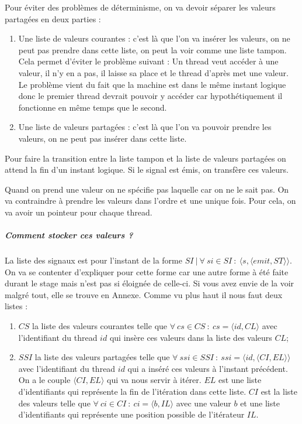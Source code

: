 \documentclass[10pt,a4paper]{report}
\begin{document}
	Pour éviter des problèmes de déterminisme, on va devoir séparer les valeurs partagées en deux parties :
	\begin{enumerate}
		\item Une liste de valeurs courantes : c'est là que l'on va insérer les valeurs, on ne peut pas prendre dans cette liste, on peut la voir comme une liste tampon. Cela permet d'éviter le problème suivant : 
		\smallbreak
		Un thread veut accéder à une valeur, il n'y en a pas, il laisse sa place et le thread d'après met une valeur. Le problème vient du fait que la machine est dans le même instant logique donc le premier thread devrait pouvoir y accéder car hypothétiquement il fonctionne en même temps que le second.
		
		\item Une liste de valeurs partagées : c'est là que l'on va pouvoir prendre les valeurs, on ne peut pas insérer dans cette liste.
	\end{enumerate}
	\smallbreak
	Pour faire la transition entre la liste tampon et la liste de valeurs partagées on attend la fin d'un instant logique. Si le signal est émis, on transfère ces valeurs.
	\medbreak
	
	Quand on prend une valeur on ne spécifie pas laquelle car on ne le sait pas. On va contraindre à prendre les valeurs dans l'ordre et une unique fois. Pour cela, on va avoir un pointeur pour chaque thread. 
	
	\subparagraph{Comment stocker ces valeurs ?} 
	La liste des signaux est pour l'instant de la forme $SI~|~\forall~si \in SI~:~\langle s,\langle emit,ST \rangle\rangle$. On va se contenter d'expliquer pour cette forme car une autre forme à été faite durant le stage mais n'est pas si éloignée de celle-ci. Si vous avez envie de la voir malgré tout, elle se trouve en Annexe. Comme vu plus haut il nous faut deux listes : 
	\smallbreak
	\begin{enumerate}
		\item $CS$ la liste des valeurs courantes telle que $\forall~cs \in CS~:~cs = \langle id , CL \rangle$ avec l'identifiant du thread $id$ qui insère ces valeurs dans la liste des valeurs $CL$;
		
		\item $SSI$ la liste des valeurs partagées telle que $\forall~ssi \in SSI~:~ssi = \langle id,\langle CI,EL\rangle\rangle$ avec l'identifiant du thread $id$ qui a inséré ces valeurs à l'instant précédent. On a le couple $\langle CI,EL\rangle$ qui va nous servir à itérer. $EL$ est une liste d'identifiants qui représente la fin de l'itération dans cette liste. $CI$ est la liste des valeurs telle que $\forall~ci \in CI~:~ci = \langle b,IL\rangle$ avec une valeur $b$ et une liste d'identifiants qui représente une position possible de l'itérateur $IL$.
	\end{enumerate}
	\medbreak
	
\end{document}
